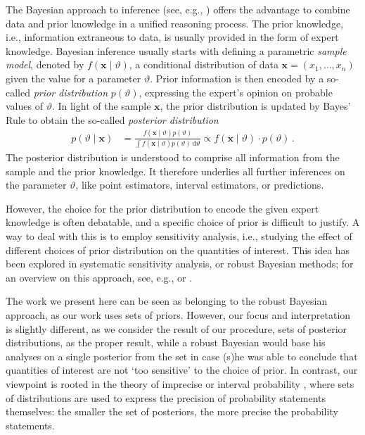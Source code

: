 \documentclass[runningheads,a4paper]{llncs}
\newcommand{\dd}{\,\mathrm{d}}
\renewcommand{\vec}[1]{{\bm #1}}
\begin{document}
The Bayesian approach to inference (see, e.g., \cite{2007:robert,2005:ruggeri}) %
offers the advantage to combine data and prior knowledge in a unified reasoning process.
The prior knowledge, i.e., information extraneous to data, is usually provided in the form of expert knowledge.
%
Bayesian inference usually starts with defining a parametric \emph{sample model},
denoted by $f(\vec{x} \mid \vartheta)$,
a conditional distribution of data $\vec{x} = (x_1, \ldots, x_n)$ given the value for a parameter $\vartheta$.
Prior information is then encoded by a so-called \emph{prior distribution} $p(\vartheta)$,
expressing the expert's opinion on probable values of $\vartheta$.
In light of the sample $\vec{x}$, the prior distribution is updated by Bayes' Rule
to obtain the so-called \emph{posterior distribution}
\begin{align}
\label{eq:bayesrule}
p(\vartheta\mid\vec{x}) &= \frac{f(\vec{x}\mid\vartheta) p(\vartheta)}{\int f(\vec{x}\mid\vartheta) p(\vartheta) \dd \vartheta}
                         \propto f(\vec{x}\mid\vartheta) \cdot p(\vartheta)\,.
\end{align}
The posterior distribution is understood to comprise all information from the sample and the prior knowledge.
It therefore underlies all further inferences on the parameter $\vartheta$,
like point estimators, interval estimators,
or predictions.

However, the choice for the prior distribution to encode the given expert knowledge is often debatable,
and a specific choice of prior is difficult to justify.
A way to deal with this is to employ sensitivity analysis,
i.e., studying the effect of different choices of prior distribution on the quantities of interest.
This idea has been explored in systematic sensitivity analysis, or robust Bayesian methods;
for an overview on this approach, see, e.g.,
\cite{1994:berger} or \cite{2000:rios}. %

The work we present here can be seen as belonging to the robust Bayesian approach, as our work uses sets of priors.
However, our focus and interpretation is slightly different,
as we consider the result of our procedure, sets of posterior distributions, as the proper result,
while a robust Bayesian would base his analyses on a single posterior from the set
in case (s)he was able to conclude that quantities of interest are not `too sensitive' to the choice of prior.
In contrast, our viewpoint is rooted in the theory of imprecise or interval probability \cite{itip,1991:walley},
where sets of distributions are used to express the precision of probability statements themselves:
the smaller the set of posteriors, the more precise the probability statements.
\end{document}

